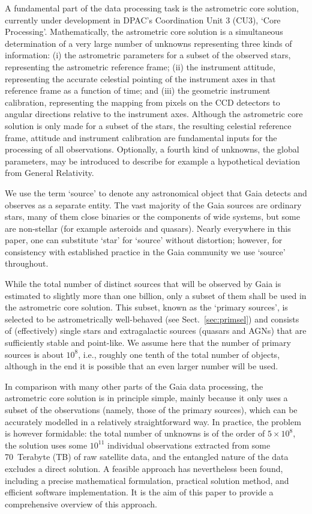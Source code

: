 \documentclass[structabstract]{aa}
\begin{document}
A fundamental part of the data processing task is the astrometric core
solution, currently under development in DPAC's Coordination Unit 3 
(CU3), `Core Processing'. Mathematically, the astrometric core solution 
is a simultaneous determination of a very large number of unknowns 
representing three kinds of information: (i) the astrometric parameters for 
a subset of the observed stars, representing the astrometric reference frame;
(ii) the instrument attitude, representing the accurate celestial
pointing of the instrument axes in that reference frame as a function
of time; and (iii) the geometric instrument calibration, representing
the mapping from pixels on the CCD detectors to angular directions
relative to the instrument axes. Although the astrometric core solution
is only made for a subset of the stars, the resulting celestial reference
frame, attitude and instrument calibration are fundamental inputs for
the processing of all observations. Optionally, a fourth kind of
unknowns, the global parameters, may be introduced to describe for
example a hypothetical deviation from General Relativity.

We use the term `source' to denote any astronomical object that Gaia detects
and observes as a separate entity. The vast majority of the Gaia sources are
ordinary stars, many of them close binaries or the components of wide systems,
but some are non-stellar (for example asteroids and quasars). Nearly everywhere 
in this paper, one can substitute `star' for `source' without distortion; however, 
for consistency with established practice in the Gaia community we use `source' 
throughout.

While the total number of distinct sources that will be observed by Gaia is 
estimated to slightly more than one billion, only a subset of them shall 
be used in the astrometric core solution. This subset, known as the 
`primary sources', is selected to be astrometrically well-behaved
(see Sect.~\ref{sec:primsel}) and consists of (effectively) 
single stars and extragalactic sources (quasars and AGNs) that are 
sufficiently stable and point-like. We assume here that the number of
primary sources is about $10^8$, i.e., roughly one tenth of the total
number of objects, although in the end it is possible that an even larger 
number will be used.
 
In comparison with many other parts of the Gaia data processing, the
astrometric core solution is in principle simple, mainly because it
only uses a subset of the observations (namely, those of the primary
sources), which can be accurately modelled in a
relatively straightforward way. In practice, the problem is however
formidable: the total number of unknowns is of the order of $5\times 10^8$,
the solution uses some $10^{11}$ individual observations extracted from
some 70~Terabyte (TB) of raw satellite data, and the entangled nature of
the data excludes a direct solution. A feasible approach has nevertheless
been found, including a precise mathematical formulation, practical
solution method, and efficient software implementation. It is the aim
of this paper to provide a comprehensive overview of this approach.
\end{document}
